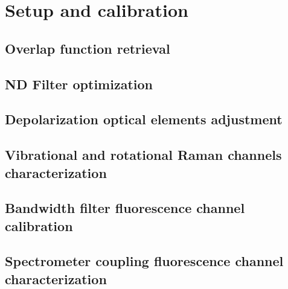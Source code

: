\chapter{Setup and calibration}
\label{sect::devs01_chapter2}

\section{Overlap function retrieval}
\label{sect::devs01_chapter2_overlap}

\section{ND Filter optimization}
\label{sect::devs01_chapter2_NDfilters}

\section{Depolarization optical elements adjustment}
\label{sect::devs01_chapter2_depolarization}

\section{Vibrational and rotational Raman channels characterization}
\label{sect::devs01_chapter2_raman}

\section{Bandwidth filter fluorescence channel calibration}
\label{sect::devs01_chapter2_bandwidth}

\section{Spectrometer coupling fluorescence channel characterization}
\label{sect::devs01_chapter2_spectrometer}